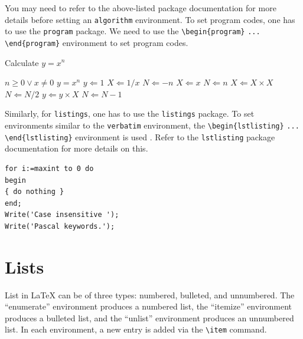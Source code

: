 \documentclass[10pt,a4paper]{article}
\begin{document}
\begin{appendices}
You may need to refer to the above-listed package documentation for more details before setting an \verb+algorithm+ environment.
To set program codes, one has to use the \verb+program+ package. We need to use the \verb+\begin{program}+ \verb+...+
\verb+\end{program}+ environment to set program codes.

\begin{algorithm}[!ht]
\caption{Calculate $y = x^n$}\label{algo1}
\begin{algorithmic}[1]
\Require $n \geq 0 \vee x \neq 0$
\Ensure $y = x^n$
\State $y \Leftarrow 1$
        \State $X \Leftarrow 1 / x$
        \State $N \Leftarrow -n$
\Else
        \State $X \Leftarrow x$
        \State $N \Leftarrow n$
\EndIf
{}
            \State $X \Leftarrow X \times X$
            \State $N \Leftarrow N / 2$
        \Else[$N$ is odd]
            \State $y \Leftarrow y \times X$
            \State $N \Leftarrow N - 1$
        \EndIf
\EndWhile
\end{algorithmic}
\end{algorithm}

Similarly, for \verb+listings+, one has to use the \verb+listings+ package. To set environments similar to the \verb+verbatim+ environment, the \verb+\begin{lstlisting}+ \verb+... + \verb+\end{lstlisting}+ environment is used . Refer to the \verb+lstlisting+ package documentation for more details on this.

\begin{minipage}{\hsize}%
\lstset{language=Pascal}%
\begin{lstlisting}[frame=single,framexleftmargin=-1pt,framexrightmargin=-17pt,framesep=12pt,linewidth=0.95\textwidth]
for i:=maxint to 0 do
begin
{ do nothing }
end;
Write('Case insensitive ');
Write('Pascal keywords.');
\end{lstlisting}
\end{minipage}


\section{Lists}\label{sec7}

List in \LaTeX{} can be of three types: numbered, bulleted, and unnumbered. The ``enumerate'' environment produces a numbered list, the 
``itemize'' environment produces a bulleted list, and the ``unlist''
environment produces an unnumbered list.
In each environment, a new entry is added via the \verb+\item+ command.


\end{appendices}
\end{document}
